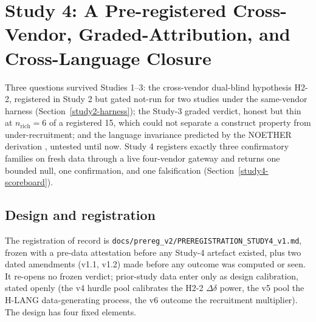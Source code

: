 \documentclass[manuscript,screen,review]{acmart}
\begin{document}
\section{Study 4: A Pre-registered Cross-Vendor, Graded-Attribution, and Cross-Language Closure}\label{study4-closure}

Three questions survived Studies 1--3: the cross-vendor dual-blind hypothesis
H2-2, registered in Study 2 but gated not-run for two studies under the
same-vendor harness (Section~\ref{study2-harness}); the Study-3 graded verdict,
honest but thin at \(n_{\mathrm{rich}} = 6\) of a registered 15, which could
not separate a construct property from under-recruitment; and the language
invariance predicted by the NOETHER derivation \citep{noether2026}, untested
until now. Study 4 registers exactly three confirmatory families on fresh
data through a live four-vendor gateway and returns one bounded null, one
confirmation, and one falsification (Section~\ref{study4-scoreboard}).

\subsection{Design and registration}\label{study4-design}

The registration of record is
\texttt{docs/prereg\_v2/PREREGISTRATION\_STUDY4\_v1.md}, frozen with a
pre-data attestation before any Study-4 artefact existed, plus two dated
amendments (v1.1, v1.2) made before any outcome was computed or seen. It
re-opens no frozen verdict; prior-study data enter only as design
calibration, stated openly (the v4 hurdle pool calibrates the H2-2
\(\Delta\delta\) power, the v5 pool the H-LANG data-generating process, the
v6 outcome the recruitment multiplier). The design has four fixed elements.
\end{document}
